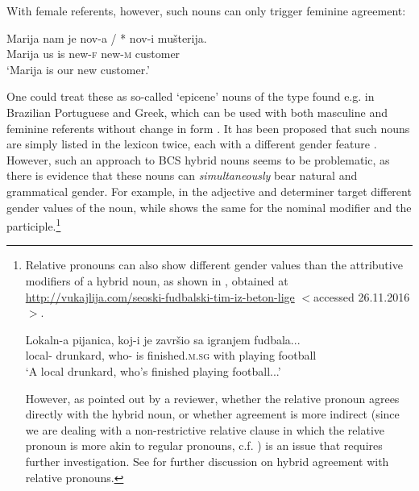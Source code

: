 \documentclass[output=paper,
modfonts,
newtxmath,
hidelinks
]{langscibook}
\begin{document}
	\ea \label{ex1}
	\label{ex1a}
	\label{ex1b}
	\label{ex1c}
	\label{ex1d}
    \z \z
	
\noindent With female referents, however, such nouns can only trigger feminine agreement:
	
	\ea \label{ex2}
	\gll Marija nam je nov-a / *\hspace{-2pt} nov-i mušterija.\\
	Marija us is new-\textsc{f} {} {} new-\textsc{m} customer\\
     \glt `Marija is our new customer.'
 \z
		
\noindent One could treat these as so-called `epicene' nouns of the type found e.g. in Brazilian Portuguese and Greek, which can be used with both masculine and feminine referents without change in form \citep{bobaljikzocca,merchant14,kramerbook}.
 It has been proposed that such nouns are simply listed in the lexicon twice, each with a different gender feature \citep[e.g.][19]{merchant14}. However, such an approach to BCS hybrid nouns seems to be problematic, as there is evidence that these nouns can \textit{simultaneously} bear natural and grammatical gender. 
 For example, in  the adjective and determiner target different gender values of the noun, while  shows the same for the nominal modifier and the participle.\footnote{Relative pronouns can also show different gender values than the attributive modifiers of a hybrid noun, as shown in , obtained at \url{http://vukajlija.com/seoski-fudbalski-tim-iz-beton-lige} $<$accessed 26.11.2016$>$.
 
\ea \gll Lokaln-a pijanica, koj-i je završio sa igranjem fudbala...\\
	local- drunkard, who- is finished.\textsc{m.sg} with playing football\\
	\glt `A local drunkard, who's finished playing football...'\label{exfn1i}
    \z

\noindent However, as pointed out by a reviewer, whether the relative pronoun agrees directly with the hybrid noun, or whether agreement is more indirect (since we are dealing with a non-restrictive relative clause in which the relative pronoun is more akin to regular pronouns, c.f. \citealt{devries06}) is an issue that requires further investigation. See \citet{arsenijevicjuksek} for further discussion on hybrid agreement with relative pronouns.}	
\end{document}
